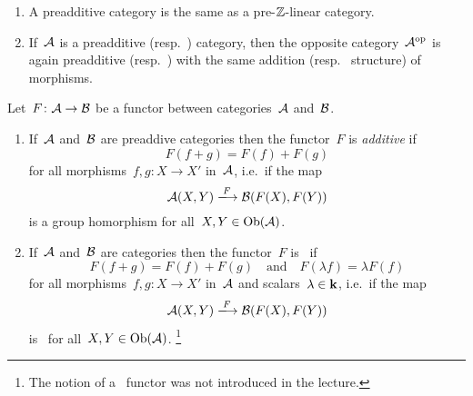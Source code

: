 \begin{remark*}
  \leavevmode
  \begin{enumerate}
    \item
      A preadditive category is the same as a pre\nobreakdash-$\mathbb{Z}$\nobreakdash-linear category.
    \item
      If~$\mathcal{A}$ is a preadditive (resp.\ {\preklin}) category, then the opposite category~$\mathcal{A}^{\mathrm{op}}$ is again preadditive (resp.\ {\preklin}) with the same addition (resp.~{\module{$\kf$}} structure) of morphisms.
  \end{enumerate}
\end{remark*}


\begin{definition}
  Let~$F \colon \mathcal{A} \to \mathcal{B}$ be a functor between categories~$\mathcal{A}$ and~$\mathcal{B}$.
  \begin{enumerate}
    \item
      If~$\mathcal{A}$ and~$\mathcal{B}$ are preaddive categories then the functor~$F$ is \emph{additive} if
      \[
          F(f + g)
        = F(f) + F(g)
      \]
      for all morphisms~$f, g \colon X \to X'$ in~$\mathcal{A}$, i.e.\ if the map
      \[
                    \Acat(X, Y)
        \xlongto{F} \Bcat(F(X), F(Y))
      \]
      is a group homorphism for all~$X, Y \in \operatorname{Ob}(\mathcal{A})$.
    \item
      If~$\mathcal{A}$ and~$\mathcal{B}$ are {\preklin} categories then the functor~$F$ is~\emph{{\klin}} if
      \[
        F(f + g) = F(f) + F(g)
        \quad\text{and}\quad
        F(\lambda f) = \lambda F(f)
      \]
      for all morphisms~$f, g \colon X \to X'$ in~$\mathcal{A}$ and scalars~$\lambda \in \mathbf{k}$, i.e.\ if the map
      \[
                    \Acat(X, Y)
        \xlongto{F} \Bcat(F(X), F(Y))
      \]
      is~{\klin} for all~$X, Y \in \operatorname{Ob}(\mathcal{A})$.%
      \footnote{The notion of a~{\klin} functor was not introduced in the lecture.}
  \end{enumerate}
\end{definition}


